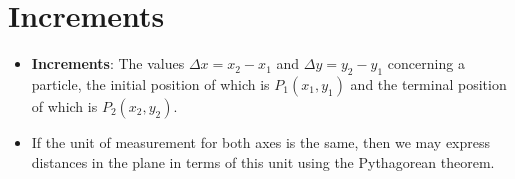 \documentclass[../main.tex]{subfiles}
\begin{document}
\section{Increments}
\begin{itemize}
    \item \textbf{Increments}: The values $\Delta x = x_2-x_1$ and $\Delta y = y_2-y_1$ concerning a particle, the initial position of which is $P_1(x_1,y_1)$ and the terminal position of which is $P_2(x_2,y_2)$.
    \item If the unit of measurement for both axes is the same, then we may express distances in the plane in terms of this unit using the Pythagorean theorem.
\end{itemize}
\end{document}
